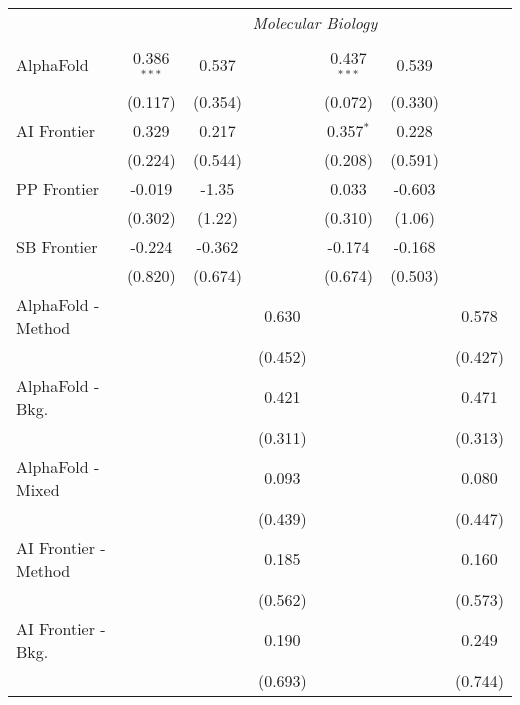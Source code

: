 \begin{tabular}{lcccccc}
 & \multicolumn{6}{c}{\textit{Molecular Biology}} \\ \\
   AlphaFold            & 0.386$^{***}$ & 0.537   &         & 0.437$^{***}$ & 0.539   &   \\   
                        & (0.117)       & (0.354) &         & (0.072)       & (0.330) &   \\   
   AI Frontier          & 0.329         & 0.217   &         & 0.357$^{*}$   & 0.228   &   \\   
                        & (0.224)       & (0.544) &         & (0.208)       & (0.591) &   \\   
   PP Frontier          & -0.019        & -1.35   &         & 0.033         & -0.603  &   \\   
                        & (0.302)       & (1.22)  &         & (0.310)       & (1.06)  &   \\   
   SB Frontier          & -0.224        & -0.362  &         & -0.174        & -0.168  &   \\   
                        & (0.820)       & (0.674) &         & (0.674)       & (0.503) &   \\   
   AlphaFold - Method   &               &         & 0.630   &               &         & 0.578\\   
                        &               &         & (0.452) &               &         & (0.427)\\   
   AlphaFold - Bkg.     &               &         & 0.421   &               &         & 0.471\\   
                        &               &         & (0.311) &               &         & (0.313)\\   
   AlphaFold - Mixed    &               &         & 0.093   &               &         & 0.080\\   
                        &               &         & (0.439) &               &         & (0.447)\\   
   AI Frontier - Method &               &         & 0.185   &               &         & 0.160\\   
                        &               &         & (0.562) &               &         & (0.573)\\   
   AI Frontier - Bkg.   &               &         & 0.190   &               &         & 0.249\\   
                        &               &         & (0.693) &               &         & (0.744)\\   

\end{tabular}
